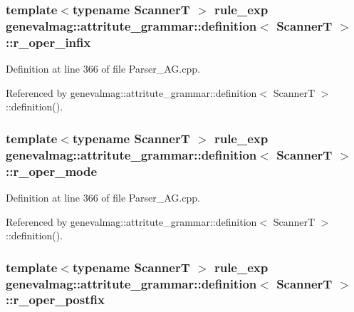 \hypertarget{structgenevalmag_1_1attritute__grammar_1_1definition_aea973cb9f0936661bca48570bf3a046c}{
\subsubsection[{r\_\-oper\_\-infix}]{\setlength{\rightskip}{0pt plus 5cm}template$<$typename ScannerT $>$ {\bf rule\_\-exp} {\bf genevalmag::attritute\_\-grammar::definition}$<$ ScannerT $>$::{\bf r\_\-oper\_\-infix}}}
\label{structgenevalmag_1_1attritute__grammar_1_1definition_aea973cb9f0936661bca48570bf3a046c}


Definition at line 366 of file Parser\_\-AG.cpp.



Referenced by genevalmag::attritute\_\-grammar::definition$<$ ScannerT $>$::definition().

\hypertarget{structgenevalmag_1_1attritute__grammar_1_1definition_a262df28d486a59c2b04c312cb25f0416}{
\subsubsection[{r\_\-oper\_\-mode}]{\setlength{\rightskip}{0pt plus 5cm}template$<$typename ScannerT $>$ {\bf rule\_\-exp} {\bf genevalmag::attritute\_\-grammar::definition}$<$ ScannerT $>$::{\bf r\_\-oper\_\-mode}}}
\label{structgenevalmag_1_1attritute__grammar_1_1definition_a262df28d486a59c2b04c312cb25f0416}


Definition at line 366 of file Parser\_\-AG.cpp.



Referenced by genevalmag::attritute\_\-grammar::definition$<$ ScannerT $>$::definition().

\hypertarget{structgenevalmag_1_1attritute__grammar_1_1definition_ac64bf6eafc41d12c0a8c9b56a2749500}{
\subsubsection[{r\_\-oper\_\-postfix}]{\setlength{\rightskip}{0pt plus 5cm}template$<$typename ScannerT $>$ {\bf rule\_\-exp} {\bf genevalmag::attritute\_\-grammar::definition}$<$ ScannerT $>$::{\bf r\_\-oper\_\-postfix}}}
\label{structgenevalmag_1_1attritute__grammar_1_1definition_ac64bf6eafc41d12c0a8c9b56a2749500}


